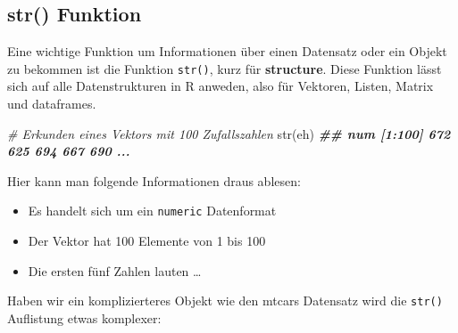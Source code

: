 \documentclass[
]{article}
\newenvironment{Shaded}{\begin{snugshade}}{\end{snugshade}}
\newcommand{\CommentTok}[1]{\textcolor[rgb]{0.56,0.35,0.01}{\textit{#1}}}
\newcommand{\DocumentationTok}[1]{\textcolor[rgb]{0.56,0.35,0.01}{\textbf{\textit{#1}}}}
\newcommand{\FunctionTok}[1]{\textcolor[rgb]{0.00,0.00,0.00}{#1}}
\newcommand{\NormalTok}[1]{#1}
\providecommand{\tightlist}{%
  \setlength{\itemsep}{0pt}\setlength{\parskip}{0pt}}
\begin{document}
\hypertarget{str-funktion}{%
\subsection{str() Funktion}\label{str-funktion}}

Eine wichtige Funktion um Informationen über einen Datensatz oder ein Objekt zu bekommen ist die Funktion \texttt{str()}, kurz für \textbf{structure}. Diese Funktion lässt sich auf alle Datenstrukturen in R anweden, also für Vektoren, Listen, Matrix und dataframes.

\begin{Shaded}
\begin{Highlighting}[]
\CommentTok{\# Erkunden eines Vektors mit 100 Zufallszahlen}
\FunctionTok{str}\NormalTok{(eh)}
\DocumentationTok{\#\#  num [1:100] 672 625 694 667 690 ...}
\end{Highlighting}
\end{Shaded}

Hier kann man folgende Informationen draus ablesen:

\begin{itemize}
\tightlist
\item
  Es handelt sich um ein \texttt{numeric} Datenformat
\item
  Der Vektor hat 100 Elemente von 1 bis 100
\item
  Die ersten fünf Zahlen lauten \ldots{}
\end{itemize}

Haben wir ein komplizierteres Objekt wie den mtcars Datensatz wird die \texttt{str()} Auflistung etwas komplexer:

\begin{Shaded}
\end{Shaded}
\end{document}
